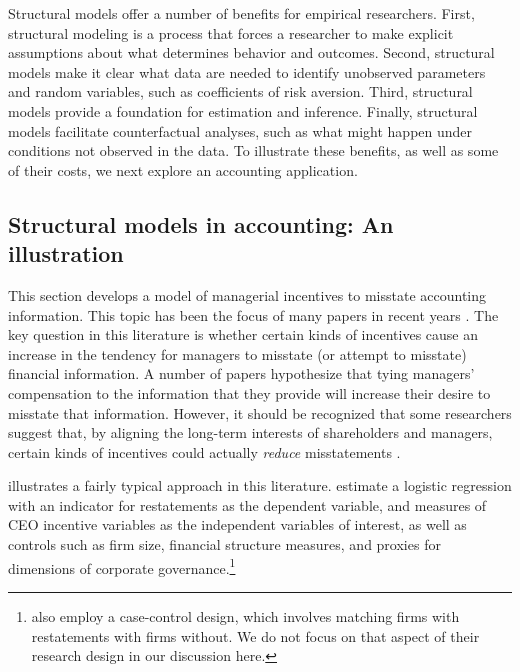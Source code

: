 Structural models offer a number of benefits for empirical researchers.
First, structural modeling is a process that forces a researcher to make explicit assumptions about what determines behavior and outcomes. 
Second, structural models make it clear what data are needed to identify unobserved parameters and random variables, such as coefficients of risk aversion.
Third, structural models provide a foundation for estimation and inference. 
Finally, structural models facilitate counterfactual analyses, such as what might happen under conditions not observed in the data. 
To illustrate these benefits, as well as some of their costs, we next explore an accounting application.

\subsection{Structural models in accounting: An illustration}
This section develops a model of managerial incentives to misstate accounting information. This topic has been the focus of many papers in recent years \citep[see][]{Armstrong:2010jd}.
The key question in this literature is whether certain kinds of incentives cause an increase in the tendency for managers to misstate (or attempt to misstate) financial information.
A number of papers hypothesize that tying managers' compensation to the information that they provide will increase their desire to misstate that information.
However, it should be recognized that some researchers suggest that, by aligning the long-term interests of shareholders and managers, certain kinds of incentives could actually \emph{reduce} misstatements \citep{Burns:2006ce}.

\citet{Efendi:2007ja} illustrates a fairly typical approach in this literature. 
\citet[p.\,687]{Efendi:2007ja} estimate a logistic regression with an indicator for restatements as the dependent variable, and measures of CEO incentive variables as the independent variables of interest, as well as controls such as firm size, financial structure measures, and proxies for dimensions of corporate governance.\footnote{
\citep{Efendi:2007ja} also employ a case-control design, which involves matching firms with restatements with firms without.
We do not focus on that aspect of their research design in our discussion here.}
 
